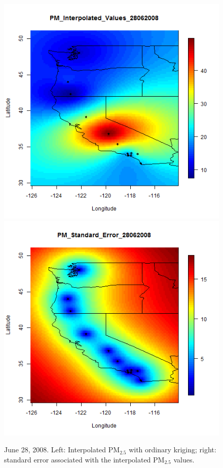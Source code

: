 \documentclass[10pt]{article}
\begin{document}
\begin{figure}[H]
\centering
  \includegraphics[width=.45\textwidth]{Interpolated_PM2008_0180.png}
  \includegraphics[width= .45\textwidth]{Standard_Error_PM2008_0180.png}
\caption{June 28, 2008.  Left: Interpolated PM$_{2.5}$ with ordinary kriging; right:
standard error associated with the interpolated PM$_{2.5}$ values.}
\label{june28}
\end{figure}
\end{document}
